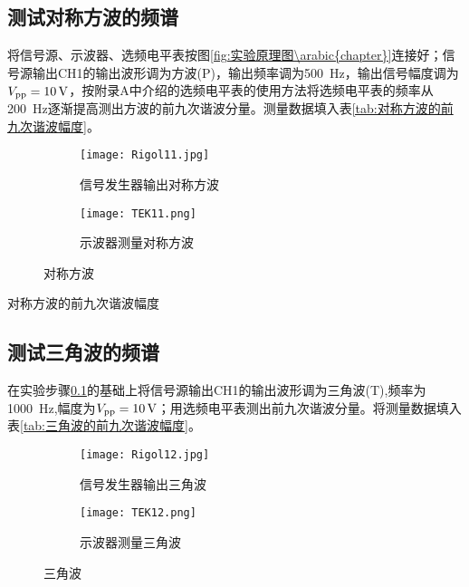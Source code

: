 \subsection{测试对称方波的频谱}%
\label{sub:测试对称方波的频谱}

将信号源、示波器、选频电平表按图\ref{fig:实验原理图\arabic{chapter}}连接好；信号源输出CH1的输出波形调为方波(P)，输出频率调为\SI{500}{Hz}，输出信号幅度调为$ V_\text{\text{pp}}=\SI{10}{V} $，按附录A中介绍的选频电平表的使用方法将选频电平表的频率从\SI{200}{Hz}逐渐提高测出方波的前九次谐波分量。测量数据填入表\ref{tab:对称方波的前九次谐波幅度}。

\begin{figure}[htpb]
	\centering
	\begin{subfigure}[htpb]{.45\linewidth}
		\centering
		\texttt{[image: Rigol11.jpg]}
		\caption{信号发生器输出对称方波}
		\label{fig:信号发生器输出对称方波}
	\end{subfigure}
	\quad
	\begin{subfigure}[htpb]{.45\linewidth}
		\centering
		\texttt{[image: TEK11.png]}
		\caption{示波器测量对称方波}
		\label{fig:示波器测量对称方波}
	\end{subfigure}
	\caption{对称方波}
	\label{fig:对称方波}
\end{figure}

\begin{table}[htpb]
	\centering
	\caption{对称方波的前九次谐波幅度}
	\label{tab:对称方波的前九次谐波幅度}
\end{table}

\subsection{测试三角波的频谱}%
\label{sub:测试三角波的频谱}

在实验步骤\ref{sub:测试对称方波的频谱}的基础上将信号源输出CH1的输出波形调为三角波(T),频率为\SI{1000}{Hz},幅度为$ V_\text{\text{pp}}=\SI{10}{V} $；用选频电平表测出前九次谐波分量。将测量数据填入表\ref{tab:三角波的前九次谐波幅度}。

\begin{figure}[htpb]
	\centering
	\begin{subfigure}[htpb]{.45\linewidth}
		\centering
		\texttt{[image: Rigol12.jpg]}
		\caption{信号发生器输出三角波}
		\label{fig:信号发生器输出三角波}
	\end{subfigure}
	\quad
	\begin{subfigure}[htpb]{.45\linewidth}
		\centering
		\texttt{[image: TEK12.png]}
		\caption{示波器测量三角波}
		\label{fig:示波器测量三角波}
	\end{subfigure}
	\caption{三角波}
	\label{fig:三角波}
\end{figure}

